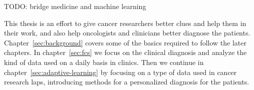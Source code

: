 TODO: bridge medicine and machine learning

This thesis is an effort to give cancer researchers better clues and help them in their work, and also help oncologists and clinicians better diagnose the patients. Chapter~\ref{sec:background} covers some of the basics required to follow the later chapters. In chapter~\ref{sec:fcs} we focus on the clinical diagnosis and analyze the kind of data used on a daily basis in clinics. Then we continue in chapter~\ref{sec:adaptive-learning} by focusing on a type of data used in cancer research laps, introducing methods for a personalized diagnosis for the patients.

